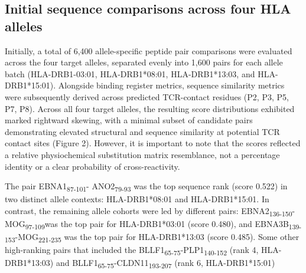 \documentclass[11pt]{article}
\begin{document}
\subsection{Initial sequence comparisons across four HLA alleles}
Initially, a total of 6,400 allele-specific peptide pair comparisons were evaluated across the four target alleles, separated evenly into 1,600 pairs for each allele batch (HLA-DRB1-03:01, HLA-DRB1*08:01, HLA-DRB1*13:03, and HLA-DRB1*15:01). Alongside binding register metrics, sequence similarity metrics were subsequently derived across predicted TCR-contact residues (P2, P3, P5, P7, P8). Across all four target alleles, the resulting score distributions exhibited marked rightward skewing, with a minimal subset of candidate pairs demonstrating elevated structural and sequence similarity at potential TCR contact sites (Figure 2). However, it is important to note that the scores reflected a relative physiochemical substitution matrix resemblance, not a percentage identity or a clear probability of cross-reactivity.

The pair EBNA1\textsubscript{87-101}- ANO2\textsubscript{79-93} was the top sequence rank (score 0.522) in two distinct allele contexts: HLA-DRB1*08:01 and HLA-DRB1*15:01. In contrast, the remaining allele cohorts were led by different pairs: EBNA2\textsubscript{136-150}-MOG\textsubscript{97-109}was the top pair for HLA-DRB1*03:01 (score 0.480), and EBNA3B\textsubscript{139-153}-MOG\textsubscript{221-235} was the top pair for HLA-DRB1*13:03 (score 0.485). Some other high-ranking pairs that included the BLLF1\textsubscript{65-75}-PLP1\textsubscript{140-152} (rank 4, HLA-DRB1*13:03) and BLLF1\textsubscript{65-75}-CLDN11\textsubscript{193-207} (rank 6, HLA-DRB1*15:01)
\end{document}

